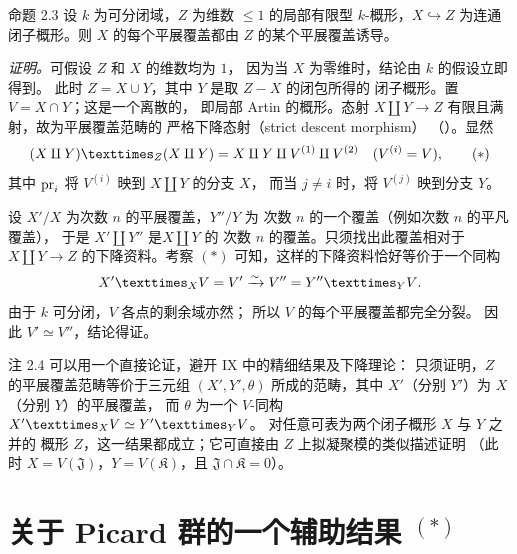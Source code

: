 \begin{enonce*}{命题 2.3}
设 $k$ 为可分闭域，$Z$ 为维数
$\leq1$ 的局部有限型 $k$-概形，$X\hookrightarrow Z$
为连通闭子概形。则 $X$ 的每个平展覆盖都由
$Z$ 的某个平展覆盖诱导。
\end{enonce*}

\noindent
\emph{证明。}可假设 $Z$ 和 $X$ 的维数均为 $1$，
因为当 $X$ 为零维时，结论由 $k$ 的假设立即得到。
此时 $Z=X\cup Y$，其中 $Y$ 是取 $Z-X$ 的闭包所得的
闭子概形。置 $V=X\cap Y$；这是一个离散的，
即局部 Artin 的概形。态射
$X\amalg Y\rightarrow Z$ 有限且满射，故为平展覆盖范畴的
严格下降态射（strict descent morphism）
（\SGA {}）。显然
\begin{equation*}
\fprod{(X\amalg Y)}{(X\amalg Y)}{Z}
=X\amalg Y\amalg V^{(1)}\amalg V^{(2)}
\quad(V^{(i)}=V){\quoi},\tag{$\ast$}
\end{equation*}
其中 $\operatorname{pr}_i$ 将 $V^{(i)}$ 映到 $X\amalg Y$ 的分支 $X$，
而当 $j\neq i$ 时，将 $V^{(j)}$ 映到分支 $Y$。

设 $X'/X$ 为次数 $n$ 的平展覆盖，$Y''/Y$ 为
次数 $n$ 的一个覆盖（例如次数 $n$ 的平凡覆盖），
于是 $X'\amalg Y''$ 是\pageoriginale $X\amalg Y$ 的
次数 $n$ 的覆盖。只须找出此覆盖相对于
$X\amalg Y\rightarrow Z$ 的下降资料。考察
$(\ast)$ 可知，这样的下降资料恰好等价于一个同构
$$
\fprod{X'}{V}{X}=V'\xrightarrow{\sim}
V''=\fprod{Y''}{V}{Y}{\quoi}.
$$
由于 $k$ 可分闭，$V$ 各点的剩余域亦然；
所以 $V$ 的每个平展覆盖都完全分裂。
因此 $V'\simeq V''$，结论得证。

\begin{enonce*}[remark]{注 2.4}
可以用一个直接论证，避开 \SGA IX 中的精细结果及下降理论：
只须证明，$Z$ 的平展覆盖范畴等价于三元组
$(X',Y',\theta)$ 所成的范畴，其中
$X'$（分别 $Y'$）为 $X$（分别 $Y$）的平展覆盖，
而 $\theta$ 为一个 $V$-同构
$\fprod{X'}{V}{X}\simeq\fprod{Y'}{V}{Y}$。
对任意可表为两个闭子概形 $X$ 与 $Y$ 之并的
概形 $Z$，这一结果都成立；它可直接由
$Z$ 上拟凝聚模的类似描述证明
（此时 $X=V(\mathfrak J)$，$Y=V(\mathfrak K)$，且
$\mathfrak J\cap\mathfrak K=0$）。
\end{enonce*}

\section{关于 Picard 群的一个辅助结果 ${}^{(*)}$}

